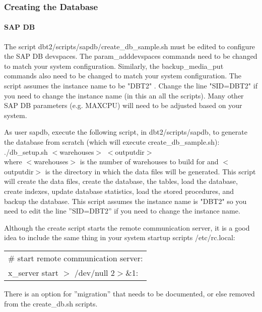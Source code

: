 \documentclass{article}
\begin{document}
\subsubsection{Creating the Database}

\paragraph{SAP DB}

The script dbt2/scripts/sapdb/create\_db\_sample.sh must be edited to
configure the SAP DB devspaces.  The param\_adddevspaces commands need to be
changed to match your system configuration.  Similarly, the backup\_media\_put
commands also need to be changed to match your system configuration.  The
script assumes the instance name to be "DBT2" .  Change the line "SID=DBT2"
if you need to change the instance name (in this an all the scripts).  Many
other SAP DB parameters (e.g. MAXCPU) will need to be adjusted based on your
system.

As user sapdb, execute the following script, in dbt2/scripts/sapdb, to
generate the database from scratch (which will execute create\_db\_sample.sh): \\
./db\_setup.sh $<$warehouses$>$ $<$outputdir$>$ \\
where $<$warehouses$>$ is the number of warehouses to build for and $<$outputdir$>$
is the directory in which the data files will be generated.  This script will
create the data files, create the database, the tables, load the database,
create indexes, update database statistics, load the stored procedures, and
backup the database.  This script assumes the instance name is "DBT2" so you
need to edit the line ''SID=DBT2'' if you need to change the instance name.

Although the create script starts the remote communication server, it is a
good idea to include the same thing in your system startup scripts
/etc/rc.local: \\
\begin{tabular}[c]{l}
\# start remote communication server: \\
x\_server start $>$ /dev/null 2$>$\&1: \\
\end{tabular}

There is an option for ''migration'' that needs to be documented, or else
removed from the create\_db.sh scripts.
\end{document}
